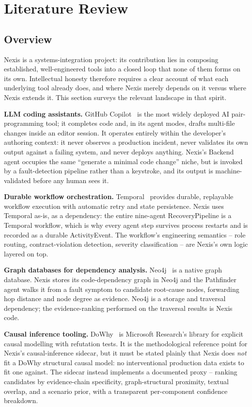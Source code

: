 \chapter{Literature Review}
\label{ch:literature}

\section{Overview}
\label{sec:lit-overview}

Nexis is a systems-integration project: its contribution lies in composing
established, well-engineered tools into a closed loop that none of them forms
on its own. Intellectual honesty therefore requires a clear account of what
each underlying tool already does, and where Nexis merely depends on it versus
where Nexis extends it. This section surveys the relevant landscape in that
spirit.

\textbf{LLM coding assistants.} GitHub Copilot~\cite{copilot} is the most
widely deployed AI pair-programming tool; it completes code and, in its agent
modes, drafts multi-file changes inside an editor session. It operates
entirely within the developer's authoring context: it never observes a
production incident, never validates its own output against a failing system,
and never deploys anything. Nexis's Backend agent occupies the same
``generate a minimal code change'' niche, but is invoked by a fault-detection
pipeline rather than a keystroke, and its output is machine-validated before
any human sees it.

\textbf{Durable workflow orchestration.} Temporal~\cite{temporal} provides
durable, replayable workflow execution with automatic retry and state
persistence. Nexis uses Temporal as-is, as a dependency: the entire nine-agent
RecoveryPipeline is a Temporal workflow, which is why every agent step
survives process restarts and is recorded as a durable ActivityEvent. The
workflow's engineering semantics -- role routing, contract-violation
detection, severity classification -- are Nexis's own logic layered on top.

\textbf{Graph databases for dependency analysis.} Neo4j~\cite{neo4j} is a
native graph database. Nexis stores its code-dependency graph in Neo4j and
the Pathfinder agent walks it from a fault symptom to candidate root-cause
nodes, forwarding hop distance and node degree as evidence. Neo4j is a
storage and traversal dependency; the evidence-ranking performed on the
traversal results is Nexis code.

\textbf{Causal inference tooling.} DoWhy~\cite{dowhy} is Microsoft
Research's library for explicit causal modelling with refutation tests. It is
the methodological reference point for Nexis's causal-inference sidecar, but
it must be stated plainly that Nexis does \emph{not} fit a DoWhy structural
causal model: no interventional production data exists to fit one against.
The sidecar instead implements a documented proxy -- ranking candidates by
evidence-chain specificity, graph-structural proximity, textual overlap, and
a scenario prior, with a transparent per-component confidence breakdown.


